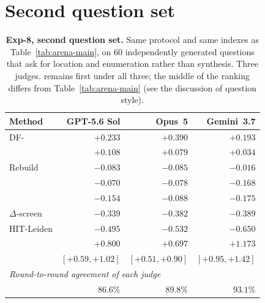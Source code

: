 \clearpage
\appendix
\section{Second question set}
\label{app:arena-set-b}

\begin{table}[tb]\centering
\caption{\textbf{Exp-8, second question set.} Same protocol and same indexes as
Table~\ref{tab:arena-main}, on $60$ independently generated questions that ask
for location and enumeration rather than synthesis. Three judges. \DyLo{}
remains first under all three; the middle of the ranking differs from
Table~\ref{tab:arena-main} (see the discussion of question style).}
\label{tab:arena-appendix}
\begin{footnotesize}
\setlength{\tabcolsep}{0.38em}
\begin{tabular}{lrrr}
\toprule
Method & GPT-5.6 Sol & Opus~5 & Gemini~3.7 \\
\midrule
DF-\Louvain{}   & $+0.233$ & $+0.390$ & $+0.193$ \\
\QCA{}          & $+0.108$ & $+0.079$ & $+0.034$ \\
Rebuild         & $-0.083$ & $-0.085$ & $-0.016$ \\
\Batch{}        & $-0.070$ & $-0.078$ & $-0.168$ \\
\DynaMo{}       & $-0.154$ & $-0.088$ & $-0.175$ \\
$\Delta$-screen & $-0.339$ & $-0.382$ & $-0.389$ \\
HIT-Leiden      & $-0.495$ & $-0.532$ & $-0.650$ \\
\midrule
\DyLo{} & $\mathbf{+0.800}$ & $\mathbf{+0.697}$ & $\mathbf{+1.173}$ \\
 & \scriptsize$[+0.59,+1.02]$ & \scriptsize$[+0.51,+0.90]$ & \scriptsize$[+0.95,+1.42]$ \\
\midrule
\multicolumn{4}{l}{\emph{Round-to-round agreement of each judge}} \\
                & $86.6\%$ & $89.8\%$ & $93.1\%$ \\
\bottomrule
\end{tabular}
\end{footnotesize}
\end{table}
